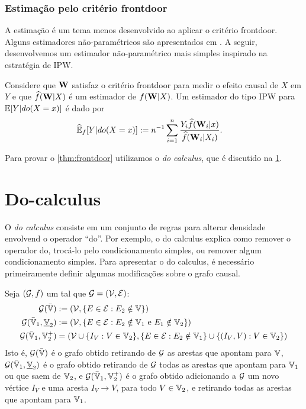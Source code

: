 \subsubsection{Estimação pelo critério frontdoor}

A estimação é um tema menos desenvolvido
ao aplicar o critério frontdoor.
Alguns estimadores não-paramétricos
são apresentados em \citet{Tchetgen2012}.
A seguir, desenvolvemos 
um estimador não-paramétrico mais simples 
inspirado na estratégia de IPW.

\begin{definition}
 \label{def:frontdoor_ipw}
 Considere que ${\mathbf{W}}$ satisfaz o critério frontdoor
 para medir o efeito causal de $X$ em $Y$ e que
 $\widehat{f}({\mathbf{W}}|X)$ é um estimador de $f({\mathbf{W}}|X)$.
 Um estimador do tipo IPW para
 ${\mathbb E}[Y|do(X=x)]$ é dado por
 \begin{align*}
  \widehat{{\mathbb E}}_{f}[Y|do(X=x)]
  &:= n^{-1}\sum_{i=1}^n \frac{Y_i \widehat{f}({\mathbf{W}}_i|x)}{\widehat{f}({\mathbf{W}}_i|X_i)}.
 \end{align*}
\end{definition}

Para provar o \cref{thm:frontdoor}
utilizamos o \textit{do calculus}, 
que é discutido na \cref{sec:do_calculus}.

\section{Do-calculus}
\label{sec:do_calculus}

O \textit{do calculus} consiste em 
um conjunto de regras para
alterar densidade envolvend o operador ``do''.
Por exemplo, o do calculus explica 
como remover o operador do,
trocá-lo pelo condicionamento simples, ou
remover algum condicionamento simples.
Para apresentar o do calculus,
é necessário primeiramente definir
algumas modificações sobre o grafo causal.

\begin{definition}
 \label{def:do_graph}
 Seja $({\mathcal G},f)$ um \CM tal que ${\mathcal G} = ({\mathcal V},{\mathcal E})$:
 \begin{align*}
  {\mathcal G}(\bar{{\mathbb V}}) 
  &:= ({\mathcal V}, \{E \in {\mathcal E}: E_2 \notin {\mathbb V}\}) \\
  {\mathcal G}(\bar{{\mathbb V}}_1, \underline{{\mathbb V}}_2)
  &:= ({\mathcal V}, \{E \in {\mathcal E}: E_2 \notin {\mathbb V}_1 \text{ e } E_1 \notin {\mathbb V}_2\}) \\
  {\mathcal G}(\bar{{\mathbb V}}_1, {\mathbb V}_2^{+})
  &= ({\mathcal V} \cup \{I_V: V \in {\mathbb V}_2\}, 
  \{E \in {\mathcal E}: E_2 \notin {\mathbb V}_1\} \cup \{(I_V, V): V \in {\mathbb V}_2\})
 \end{align*}
 Isto é, ${\mathcal G}(\bar{{\mathbb V}})$ é
 o grafo obtido retirando de ${\mathcal G}$ as arestas que apontam para ${\mathbb V}$,
 ${\mathcal G}(\bar{{\mathbb V}}_1, \underline{{\mathbb V}}_2)$ é 
 o grafo obtido retirando de ${\mathcal G}$ 
 todas as arestas que apontam para ${\mathbb V}_1$ ou 
 que saem de ${\mathbb V}_2$, e
 ${\mathcal G}(\bar{{\mathbb V}}_1, {\mathbb V}_2^{+})$ é 
 o grafo obtido adicionando a ${\mathcal G}$ um novo vértice $I_V$ e
 uma aresta $I_V \rightarrow V$, para todo $V \in {\mathbb V}_2$, e
 retirando todas as arestas que apontam para ${\mathbb V}_1$.
\end{definition}

